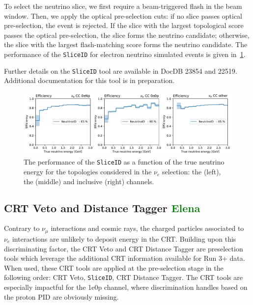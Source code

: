 To select the neutrino slice, we first require a beam-triggered flash in the beam window. 
Then, we apply the optical pre-selection cuts: if no slice passes optical pre-selection, the event is rejected. 
If the slice with the largest topological score passes the optical pre-selection, the slice forms the neutrino candidate; otherwise, the slice with the largest flash-matching score forms the neutrino candidate.
The performance of the \texttt{SliceID} for electron neutrino simulated events is given in~\cref{fig:sliceid}.

Further details on the \texttt{SliceID} tool are available in DocDB 23854 and 22519. Additional documentation for this tool is in preparation.



\begin{figure}[H]
    \centering
    \includegraphics[width=\textwidth]{NuId-Ch2/Images/efficiency_cat_0.pdf}
    \caption{The performance of the \texttt{SliceID} as a function of the true neutrino energy for the topologies considered in the $\nu_e$ selection: the \npsel (left), the  \zpsel (middle) and inclusive (right) channels.}
    \label{fig:sliceid}
\end{figure}



\subsection{CRT Veto and Distance Tagger \textcolor{green}{Elena}}
\label{sec:sliceID:CRT}
Contrary to  $\nu_\mu$ interactions and cosmic rays, the charged particles associated to $\nu_e$ interactions are unlikely to deposit energy in the CRT. Building upon this discriminating factor, the CRT Veto and CRT Distance Tagger are preselection tools which leverage the additional CRT information available for Run 3+ data.
When used, these CRT tools are applied at the pre-selection stage in the following order: CRT Veto, \texttt{SliceID}, CRT Distance Tagger. The CRT tools are especially impactful for the 1e0p channel, where discrimination handles based on the proton PID are obviously missing. \\


